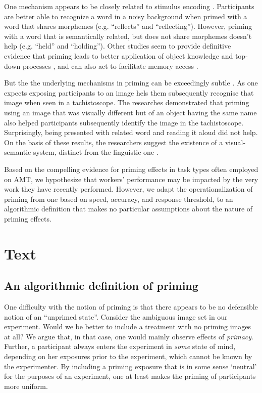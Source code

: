 \documentclass[a4paper]{report}
\begin{document}
One mechanism appears to be 
closely related to stimulus encoding \cite{BJOP:BJOP1826}.
Participants are better able to recognize a word in a noisy background when 
primed with a word that shares morphemes 
(e.g. ``reflects'' and ``reflecting'').  However, priming 
with a word that is semantically related, but does not share morphemes doesn't 
help (e.g. ``held'' and ``holding'')\cite{BJOP:BJOP1826}.  Other studies seem
to provide definitive evidence that priming leads to better 
application of object knowledge and top-down processes \cite{Ghuman17062008},
and can also act to facilitate memory access \cite{beller1971priming}.  

But the the underlying mechanisms in priming
can be exceedingly subtle \cite{BJOP:BJOP1796}.  As one expects exposing 
participants to an image hels them subsequently recognise that 
image when seen in a tachistoscope.  The researches demonstrated that priming 
using an image that was visually different but of an object having the same 
name also helped participants subsequently identify the image in the 
tachistoscope.  Surprisingly, being presented with related word and 
reading it aloud did not help.  On the basis of these 
results, the researchers suggest the existence of a visual-semantic system,
distinct from the linguistic one \cite{BJOP:BJOP1796}.

Based on the compelling evidence for priming effects in task types often 
employed on AMT, we hypothesize that workers' performance may be impacted
by the very work they have recently performed.  However, we adapt the 
operationalization of priming from one based on speed, accuracy, and 
response threshold, to an algorithmic definition that makes no particular
assumptions about the nature of priming effects.
	

\section*{Text}
\subsection*{An algorithmic definition of priming}
One difficulty with the notion of priming is that there appears to be no 
defensible notion of an ``unprimed state''.  Consider the ambiguous image set 
in our experiment.  Would we be better to include a treatment with no
priming images at all?  We argue that, in that case, one would mainly observe  
effects of \textit{primacy}.  
Further, a participant always enters the experiment in \textit{some} state of 
mind, depending on her exposures prior to the experiment, which cannot be 
known by the experimenter.  By including a priming exposure that is in some 
sense `neutral' for the purposes of an experiment, one at least makes the 
priming of participants more uniform.  
\end{document}
